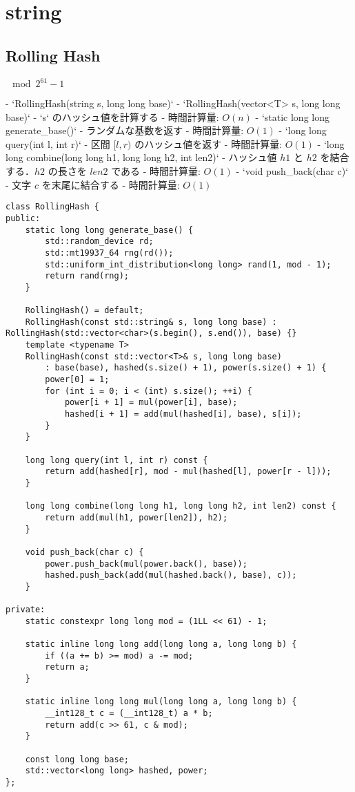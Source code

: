 \section{string}

\subsection{Rolling Hash}

\begin{small}
\begin{markdown}
$\mod 2^{61} - 1$

- `RollingHash(string s, long long base)`
- `RollingHash(vector<T> s, long long base)`
    - `s` のハッシュ値を計算する
    - 時間計算量: $O(n)$
- `static long long generate\_base()`
    - ランダムな基数を返す
    - 時間計算量: $O(1)$
- `long long query(int l, int r)`
    - 区間 $[l, r)$ のハッシュ値を返す
    - 時間計算量: $O(1)$
- `long long combine(long long h1, long long h2, int len2)`
    - ハッシュ値 $h1$ と $h2$ を結合する．$h2$ の長さを $len2$ である
    - 時間計算量: $O(1)$
- `void push\_back(char c)`
    - 文字 $c$ を末尾に結合する
    - 時間計算量: $O(1)$

\end{markdown}
\end{small}

\begin{lstlisting}
class RollingHash {
public:
    static long long generate_base() {
        std::random_device rd;
        std::mt19937_64 rng(rd());
        std::uniform_int_distribution<long long> rand(1, mod - 1);
        return rand(rng);
    }

    RollingHash() = default;
    RollingHash(const std::string& s, long long base) : RollingHash(std::vector<char>(s.begin(), s.end()), base) {}
    template <typename T>
    RollingHash(const std::vector<T>& s, long long base)
        : base(base), hashed(s.size() + 1), power(s.size() + 1) {
        power[0] = 1;
        for (int i = 0; i < (int) s.size(); ++i) {
            power[i + 1] = mul(power[i], base);
            hashed[i + 1] = add(mul(hashed[i], base), s[i]);
        }
    }

    long long query(int l, int r) const {
        return add(hashed[r], mod - mul(hashed[l], power[r - l]));
    }

    long long combine(long long h1, long long h2, int len2) const {
        return add(mul(h1, power[len2]), h2);
    }

    void push_back(char c) {
        power.push_back(mul(power.back(), base));
        hashed.push_back(add(mul(hashed.back(), base), c));
    }

private:
    static constexpr long long mod = (1LL << 61) - 1;

    static inline long long add(long long a, long long b) {
        if ((a += b) >= mod) a -= mod;
        return a;
    }

    static inline long long mul(long long a, long long b) {
        __int128_t c = (__int128_t) a * b;
        return add(c >> 61, c & mod);
    }

    const long long base;
    std::vector<long long> hashed, power;
};
\end{lstlisting}

